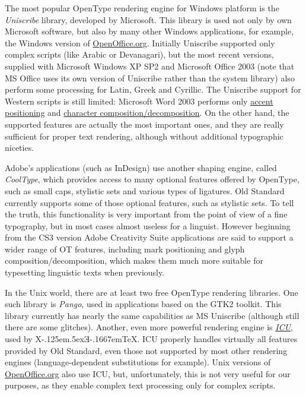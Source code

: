 \documentclass[12pt,a4paper,openany]{book}
\providecommand{\XeTeX}{X\kern-.125em\lower.5ex\hbox{Ǝ}\kern-.1667em\TeX}
\begin{document}
The most popular OpenType rendering engine for Windows platform is the
\textit{Uniscribe} library, developed by Microsoft. This library is used
not only by own Microsoft software, but also by many other Windows
applications, for example, the Windows version of
\href{http://www.openoffice.org}{OpenOffice.org}. Initially Uniscribe
supported only complex scripts (like Arabic or Devanagari), but the most
recent versions, supplied with Microsoft Windows XP SP2 and Microsoft
Office 2003 (note that MS Office uses its own version of Uniscribe rather
than the system library) also perform some processing for Latin, Greek and
Cyrillic. The Uniscribe support for Western scripts is still limited:
Microsoft Word 2003 performs only \hyperlink{mark}{accent positioning} and
\hyperlink{ccmp}{character composition/decomposition}. On the other hand,
the supported features are actually the most important ones, and they are
really sufficient for proper text rendering, although without additional
typographic niceties.

Adobe’s applications (such as InDesign) use another shaping engine, called
\textit{CoolType}, which provides access to many optional features offered 
by OpenType, such as small caps, stylistic sets and various types of ligatures. 
Old Standard currently supports some of those optional features, such as 
stylistic sets. To tell the truth, this functionality is very important from
the point of view of a fine typography, but in most cases almost useless for 
a linguist. However beginning from the CS3 version Adobe Creativity Suite
applications are said to support a wider range of OT features, including 
mark positioning and glyph composition/decomposition, which makes them much 
more suitable for typesetting linguistic texts when previously.

In the Unix world, there are at least two free OpenType rendering
libraries. One such library is \textit{Pango}, used in applications based
on the GTK2 toolkit. This library currently has nearly the same
capabilities as MS Uniscribe (although still there are some glitches).
Another, even more powerful rendering engine is
\href{http://icu.sourceforge.net}{\textit{ICU}}, used by \XeTeX. ICU
properly handles virtually all features provided by Old Standard, even those 
not supported by most other rendering engines (language-dependent substitutions 
for example). Unix versions of \href{http://www.openoffice.org}{OpenOffice.org}
also use ICU, but, unfortunately, this is not very useful for our purposes,
as they enable complex text processing only for complex scripts.
\end{document}
